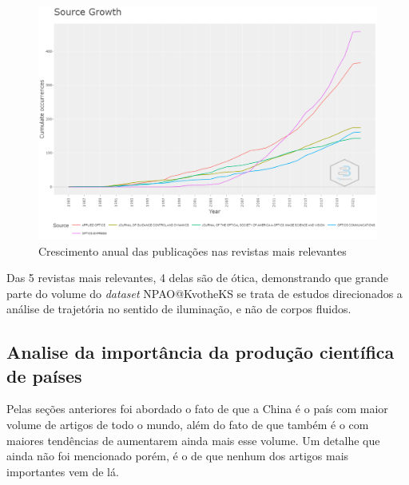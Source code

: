     \begin{figure}[H]
        \centering
        \includegraphics[width=1\textwidth]{experiments/KvotheKS/PesqBibliogr/AlgoritmosSimulacaoOptica-Dinamica/WoS-20220202/Bibliometric/Sources/Source_growth.png}
        \caption{Crescimento anual das publicações nas revistas mais relevantes}
        \label{fig:KvotheKS:Source_Growth}
    \end{figure}
    
    Das 5 revistas mais relevantes, 4 delas são de ótica, demonstrando que grande parte do volume do \emph{dataset} NPAO@KvotheKS se trata de estudos direcionados a análise de trajetória no sentido de iluminação, e não de corpos fluidos.

\subsection{Analise da importância da produção científica de países}
    
    Pelas seções anteriores foi abordado o fato de que a China é o país com maior volume de artigos de todo o mundo, além do fato de que também é o com maiores tendências de aumentarem ainda mais esse volume. Um detalhe que ainda não foi mencionado porém, é o de que nenhum dos artigos mais importantes vem de lá.
    
